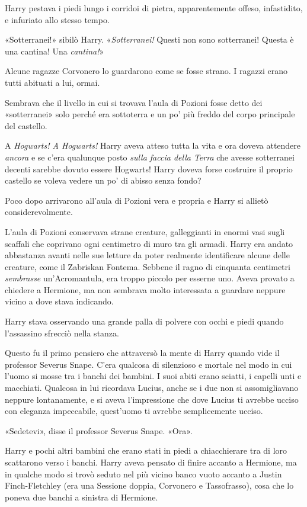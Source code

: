 Harry pestava i piedi lungo i corridoi di pietra, apparentemente offeso, infastidito, e infuriato allo stesso tempo.

«Sotterranei!» sibilò Harry. «\textit{Sotterranei!} Questi non sono sotterranei! Questa è una cantina! Una \textit{cantina!}»

Alcune ragazze Corvonero lo guardarono come se fosse strano. I ragazzi erano tutti abituati a lui, ormai.

Sembrava che il livello in cui si trovava l’aula di Pozioni fosse detto dei «sotterranei» solo perché era sottoterra e un po’ più freddo del corpo principale del castello.

A \textit{Hogwarts! A Hogwarts!} Harry aveva atteso tutta la vita e ora doveva attendere \textit{ancora} e se c’era qualunque posto \textit{sulla faccia della Terra} che avesse sotterranei decenti sarebbe dovuto essere Hogwarts! Harry doveva forse costruire il proprio castello se voleva vedere un po’ di abisso senza fondo?

Poco dopo arrivarono all’aula di Pozioni vera e propria e Harry si allietò considerevolmente.

L’aula di Pozioni conservava strane creature, galleggianti in enormi vasi sugli scaffali che coprivano ogni centimetro di muro tra gli armadi. Harry era andato abbastanza avanti nelle sue letture da poter realmente identificare alcune delle creature, come il Zabriskan Fontema. Sebbene il ragno di cinquanta centimetri \textit{sembrasse} un’Acromantula, era troppo piccolo per esserne uno. Aveva provato a chiedere a Hermione, ma non sembrava molto interessata a guardare neppure vicino a dove stava indicando.

Harry stava osservando una grande palla di polvere con occhi e piedi quando l’assassino sfrecciò nella stanza.

Questo fu il primo pensiero che attraversò la mente di Harry quando vide il professor Severus Snape. C’era qualcosa di silenzioso e mortale nel modo in cui l’uomo si mosse tra i banchi dei bambini. I suoi abiti erano sciatti, i capelli unti e macchiati. Qualcosa in lui ricordava Lucius, anche se i due non si assomigliavano neppure lontanamente, e si aveva l’impressione che dove Lucius ti avrebbe ucciso con eleganza impeccabile, quest’uomo ti avrebbe semplicemente ucciso.

«Sedetevi», disse il professor Severus Snape. «Ora».

Harry e pochi altri bambini che erano stati in piedi a chiacchierare tra di loro scattarono verso i banchi. Harry aveva pensato di finire accanto a Hermione, ma in qualche modo si trovò seduto nel più vicino banco vuoto accanto a Justin Finch-Fletchley (era una Sessione doppia, Corvonero e Tassofrasso), cosa che lo poneva due banchi a sinistra di Hermione.

